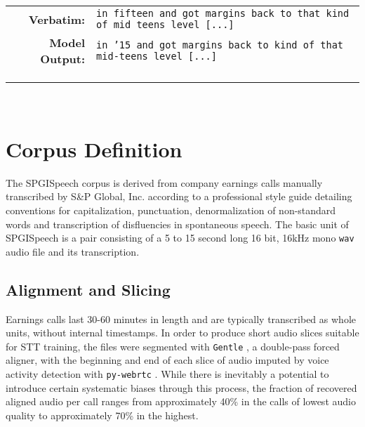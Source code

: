 \documentclass{article}
\newcommand{\corpus}{SPGISpeech}
\begin{document}
\begin{table*}[h]
{\begin{tabular}{rl}
\textbf{Verbatim:} & \texttt{in fifteen and got margins back to that kind of mid teens level [...]}\\
\textbf{Model Output:}  & \texttt{in '15 and got margins back to kind of that mid-teens level [...]} \\
  \\ [-2.2ex]
   \hline
   \\ [-1.5ex]
   \hline
  \\ [-2.2ex]
\end{tabular}
}
 \\ [0.5ex]
  \caption{\textbf{Examples of non-standard text in \corpus.}  For each textual feature we give an example of the ground truth transcript label, a verbatim transcription without casing or punctuation, and Conformer model output with end-to-end orthographic training.}

\label{tab:specialforms}
\end{table*}

\section{Corpus Definition}\label{sec:corpus}



The \corpus{} corpus is derived from company earnings calls
manually transcribed by S\&P Global, Inc. according to a professional style
guide detailing conventions for capitalization, punctuation, denormalization of non-standard words and transcription of disfluencies in spontaneous speech.  The basic unit of \corpus{} is a pair consisting of a 5 to 15 second long 16 bit, 16kHz mono \texttt{wav} audio file and its transcription.  



\subsection{Alignment and Slicing}
Earnings calls last 30-60 minutes in length and are typically transcribed as whole units, without internal timestamps.
  In order to produce short audio slices suitable for STT training, the files were segmented with \texttt{Gentle} \cite{gentle20}, a
double-pass forced aligner, with the
beginning and end of each slice of audio imputed by voice
activity detection with \texttt{py-webrtc} \cite{wiseman16}.  While there is inevitably a potential to
introduce certain systematic biases through this process, the fraction
of recovered aligned audio per call ranges from approximately 40\% in
the calls of lowest audio quality to approximately 70\% in the
highest.
\end{document}

